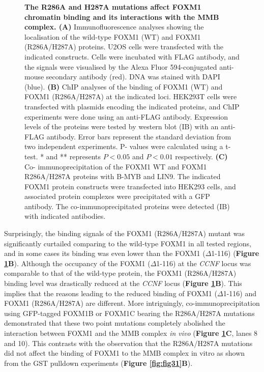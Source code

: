 \begin{figure}[!h]
    \caption[The R286A and H287A mutations affect FOXM1 chromatin binding and its interactions with the MMB complex]{\textbf{The R286A and H287A mutations affect FOXM1 chromatin binding and its interactions with the MMB complex. (A)} Immunofluorescence analyses showing the localisation of the wild-type FOXM1 (WT) and FOXM1 (R286A/H287A) proteins. U2OS cells were transfected with the indicated constructs. Cells were incubated with FLAG antibody, and the signals were visualised by the Alexa Fluor 594-conjugated anti-mouse secondary antibody (red). DNA was stained with DAPI (blue). \textbf{(B)} ChIP analyses of the binding of FOXM1 (WT) and FOXM1 (R286A/H287A) at the indicated loci. HEK293T cells were transfected with plasmids encoding the indicated proteins, and ChIP experiments were done using an anti-FLAG antibody. Expression levels of the proteins were tested by western blot (IB) with an anti-FLAG antibody. Error bars represent the standard deviation from two independent experiments. P- values were calculated using a t-test. * and ** represents $P<0.05$ and $P<0.01$ respectively. \textbf{(C)} Co- immunoprecipitation of the FOXM1 WT and FOXM1 R286A/H287A proteins with B-MYB and LIN9. The indicated FOXM1 protein constructs were transfected into HEK293 cells, and associated protein complexes were precipitated with a GFP antibody. The co-immunoprecipitated proteins were detected (IB) with indicated antibodies.}
    \label{fig:fig36}
\end{figure}

Surprisingly, the binding signals of the FOXM1 (R286A/H287A) mutant was significantly curtailed comparing to the wild-type FOXM1 in all tested regions, and in some cases its binding was even lower than the FOXM1 ($\Delta$1-116) (\textbf{Figure \ref{fig:fig36}B}). Although the occupancy of the FOXM1 ($\Delta$1-116) at the \textit{CCNF} locus was comparable to that of the wild-type protein, the FOXM1 (R286A/H287A) binding level was drastically reduced at the \textit{CCNF} locus (\textbf{Figure \ref{fig:fig36}B}). This implies that the reasons leading to the reduced binding of FOXM1 ($\Delta$1-116) and FOXM1 (R286A/H287A) are different. More intriguingly, co-immunoprecipitation using GFP-tagged FOXM1B or FOXM1C bearing the R286A/H287A mutations demonstrated that these two point mutations completely abolished the interaction between FOXM1 and the MMB complex \textit{in vivo} (\textbf{Figure \ref{fig:fig36}C}, lanes 8 and 10). This contrasts with the observation that the R286A/H287A mutations did not affect the binding of FOXM1 to the MMB complex in vitro as shown from the GST pulldown experiments (\textbf{Figure \ref{fig:fig31}B}).

